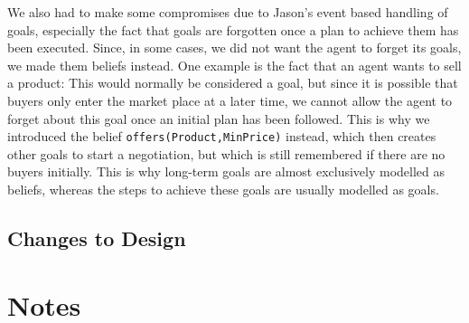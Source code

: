 \documentclass[a4paper,11pt]{article}
\begin{document}
We also had to make some compromises due to Jason's event based handling of goals, especially the fact that goals are forgotten once a plan to achieve them has been executed. Since, in some cases, we did not want the agent to forget its goals, we made them beliefs instead. One example is the fact that an agent wants to sell a product: This would normally be considered a goal, but since it is possible that buyers only enter the market place at a later time, we cannot allow the agent to forget about this goal once an initial plan has been followed. This is why we introduced the belief \texttt{offers(Product,MinPrice)} instead, which then creates other goals to start a negotiation, but which is still remembered if there are no buyers initially. This is why long-term goals are almost exclusively modelled as beliefs, whereas the steps to achieve these goals are usually modelled as goals.


\subsection{Changes to Design}


\section{Notes}
\end{document}
